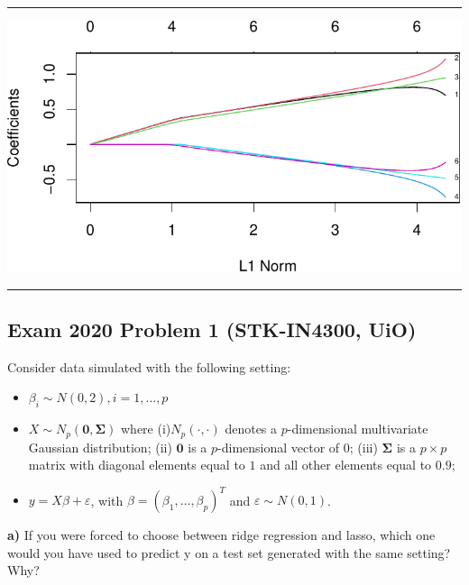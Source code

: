 \documentclass[
  letterpaper,
  DIV=11,
  numbers=noendperiod]{scrartcl}
\providecommand{\tightlist}{%
  \setlength{\itemsep}{0pt}\setlength{\parskip}{0pt}}\usepackage{longtable,booktabs,array}
\begin{document}
\begin{center}\rule{0.5\linewidth}{0.5pt}\end{center}

\includegraphics{L9_files/figure-pdf/unnamed-chunk-8-1.pdf}

\begin{center}\rule{0.5\linewidth}{0.5pt}\end{center}

\hypertarget{exam-2020-problem-1-stk-in4300-uio}{%
\subsection{Exam 2020 Problem 1 (STK-IN4300,
UiO)}\label{exam-2020-problem-1-stk-in4300-uio}}

Consider data simulated with the following setting:

\begin{itemize}
\tightlist
\item
  \(\beta_i \sim N(0,2), i=1,\ldots,p\)
\item
  \(X \sim N_p(\boldsymbol 0,\boldsymbol \Sigma)\) where
  (i)\(N_p(\cdot,\cdot)\) denotes a \(p\)-dimensional multivariate
  Gaussian distribution; (ii) \(\boldsymbol{0}\) is a \(p\)-dimensional
  vector of \(0\); (iii) \(\boldsymbol \Sigma\) is a \(p \times p\)
  matrix with diagonal elements equal to \(1\) and all other elements
  equal to \(0.9\);
\item
  \(y = X \beta + \varepsilon\), with
  \(\beta = (\beta_1,\ldots, \beta_p)^T\) and
  \(\varepsilon \sim N(0, 1)\).
\end{itemize}

\textbf{a)} If you were forced to choose between ridge regression and
lasso, which one would you have used to predict y on a test set
generated with the same setting? Why?
\end{document}
